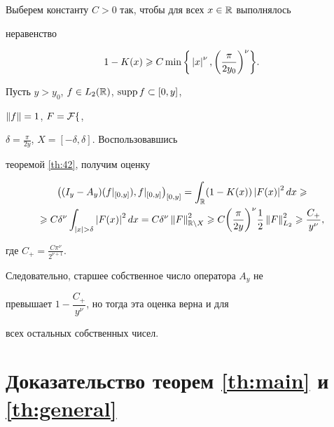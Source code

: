 \begin{pf}


Выберем константу $C>0$ так, чтобы для всех $x\in\Bbb R$ выполнялось 


неравенство


$$


1-K(x)\geqslant C\min\bigg\{\abs{x}^{\nu},


\bigg(\frac{\pi}{2y_{0}} \bigg)^{\nu}\bigg\}.


$$


Пусть $y>y_{0}$, $f\in L_{2}(\Bbb R)$, $\operatorname{supp} f\subset[0,y]$,


$\left\|f\right\|=1$, $F=\cal F f$,


$\delta=\frac{\pi}{2 y}$, $X=[-\delta,\delta]$. Воспользовавшись 


теоремой \ref{th:42}, получим оценку


\begin{multline*}


\big((I_{y}-A_{y}) (f|_{[0,y]} ), f|_{[0,y]} \big)_{[0,y]}=


\int_{\Bbb R}(1-K(x))\abs{F(x)}^{2}dx\geqslant\\


%


\geqslant C\delta^{\nu}\int_{\abs{x}>\delta}\abs{F(x)}^{2}dx=


C\delta^{\nu}\norm{F}_{\Bbb R\setminus X}^{2}\geqslant


C \bigg(\frac{\pi}{2 y} \bigg)^{\nu}\frac{1}{2}\norm{F}_{\Ltwo}^{2}\geqslant


\frac{C_{+}}{y^{\nu}},


\end{multline*}


где $C_{+}=\frac{C\pi^{\nu}}{2^{\nu+1}}$.


Следовательно, старшее собственное число оператора $A_{y}$ не 


превышает $1-\dfrac{C_{+}}{y^{\nu}}$, но тогда эта оценка верна и для 


всех остальных собственных чисел.


\end{pf}








\section{Доказательство теорем \ref{th:main} и \ref{th:general}} \label{sec:mainproof}





